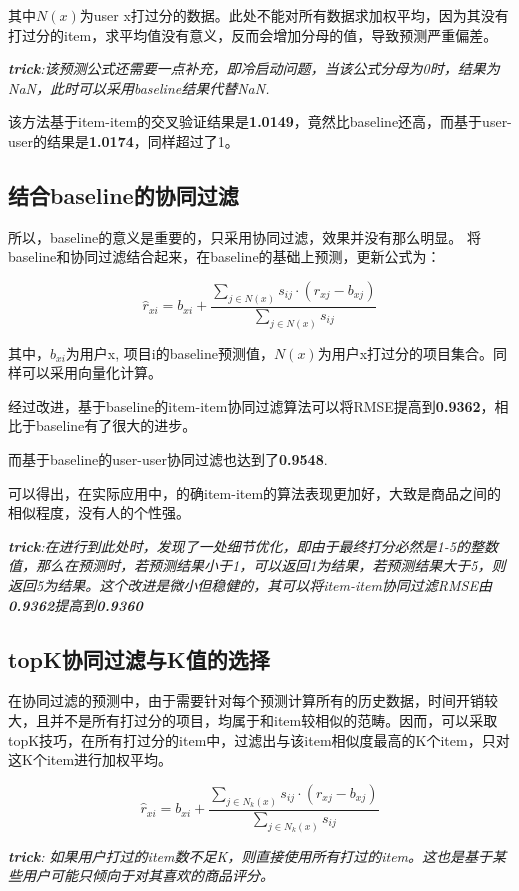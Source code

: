 \documentclass[utf8, a4paper, 11pt, onecolumn]{ctexart}
\begin{document}
\begin{spacing}{1.3}
其中$N(x)$为user x打过分的数据。此处不能对所有数据求加权平均，因为其没有打过分的item，求平均值没有意义，反而会增加分母的值，导致预测严重偏差。

\textit{\textbf{trick}:该预测公式还需要一点补充，即冷启动问题，当该公式分母为0时，结果为NaN，此时可以采用baseline结果代替NaN.}

该方法基于item-item的交叉验证结果是\textbf{1.0149}，竟然比baseline还高，而基于user-user的结果是\textbf{1.0174}，同样超过了1。

\subsection{结合baseline的协同过滤}
所以，baseline的意义是重要的，只采用协同过滤，效果并没有那么明显。
将baseline和协同过滤结合起来，在baseline的基础上预测，更新公式为：

\[\hat{r}_{xi} = b_{xi}  + \frac{\sum_{j \in N(x)} s_{ij} \cdot (r_{xj} - b_{xj})}{\sum_{j \in N(x)} s_{ij}} \]

其中，$b_{xi}$为用户x, 项目i的baseline预测值，$N(x)$为用户x打过分的项目集合。同样可以采用向量化计算。

经过改进，基于baseline的item-item协同过滤算法可以将RMSE提高到\textbf{0.9362}，相比于baseline有了很大的进步。

而基于baseline的user-user协同过滤也达到了\textbf{0.9548}.

可以得出，在实际应用中，的确item-item的算法表现更加好，大致是商品之间的相似程度，没有人的个性强。

\textit{\textbf{trick}:在进行到此处时，发现了一处细节优化，即由于最终打分必然是1-5的整数值，那么在预测时，若预测结果小于1，可以返回1为结果，若预测结果大于5，则返回5为结果。这个改进是微小但稳健的，其可以将item-item协同过滤RMSE由\textbf{0.9362}提高到\textbf{0.9360}}

\subsection{topK协同过滤与K值的选择}

在协同过滤的预测中，由于需要针对每个预测计算所有的历史数据，时间开销较大，且并不是所有打过分的项目，均属于和item较相似的范畴。因而，可以采取topK技巧，在所有打过分的item中，过滤出与该item相似度最高的K个item，只对这K个item进行加权平均。

\[\hat{r}_{xi} = b_{xi}  + \frac{\sum_{j \in N_k(x)} s_{ij} \cdot (r_{xj} - b_{xj})}{\sum_{j \in N_k(x)} s_{ij}} \]

\textit{\textbf{trick}: 如果用户打过的item数不足K，则直接使用所有打过的item。这也是基于某些用户可能只倾向于对其喜欢的商品评分。}


\end{spacing}
\end{document}

